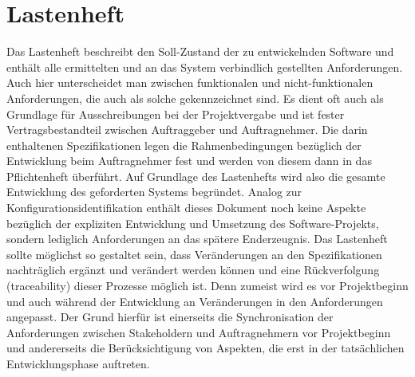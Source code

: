 \section{Lastenheft}
Das Lastenheft beschreibt den Soll-Zustand der zu entwickelnden Software und enthält alle ermittelten und an das System verbindlich gestellten Anforderungen. Auch hier unterscheidet man zwischen funktionalen und nicht-funktionalen Anforderungen, die auch als solche gekennzeichnet sind. 
Es dient oft auch als Grundlage für Ausschreibungen bei der Projektvergabe und ist fester Vertragsbestandteil zwischen Auftraggeber und Auftragnehmer. Die darin enthaltenen Spezifikationen legen die Rahmenbedingungen bezüglich der Entwicklung beim Auftragnehmer fest und werden von diesem dann in das Pflichtenheft überführt. Auf Grundlage des Lastenhefts wird also die gesamte Entwicklung des geforderten Systems begründet.
Analog zur Konfigurationsidentifikation enthält dieses Dokument noch keine Aspekte bezüglich der expliziten Entwicklung und Umsetzung des Software-Projekts, sondern lediglich Anforderungen an das spätere \Gu Enderzeugnis\Go. 
Das Lastenheft sollte möglichst so gestaltet sein, dass Veränderungen an den Spezifikationen nachträglich ergänzt und verändert werden können und eine Rückverfolgung (traceability) dieser Prozesse möglich ist. Denn zumeist wird es vor Projektbeginn und auch während der Entwicklung an Veränderungen in den Anforderungen angepasst. Der Grund hierfür ist einerseits die Synchronisation der Anforderungen zwischen Stakeholdern und Auftragnehmern vor Projektbeginn und andererseits die Berücksichtigung von Aspekten, die erst in der tatsächlichen Entwicklungsphase auftreten.
\cite{brd-lastenheft}

